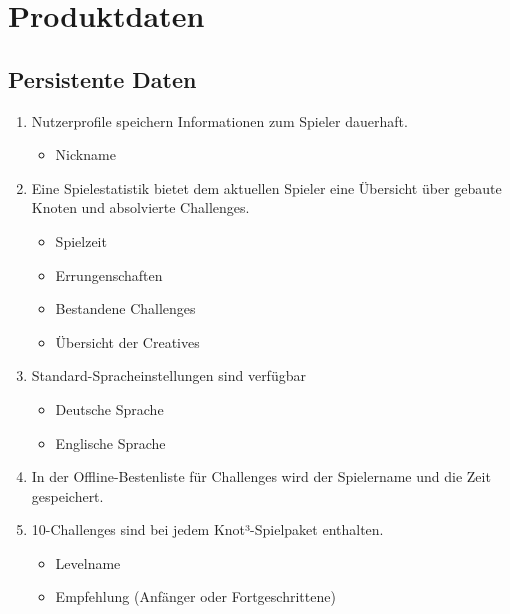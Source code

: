 \chapter{Produktdaten}

\renewcommand{\theenumi}{/PPD\_\arabic{enumi}0/}
\renewcommand{\labelenumi}{\theenumi}

\section{Persistente Daten}

\begin{enumerate}

\item Nutzerprofile speichern Informationen zum Spieler dauerhaft. 

  \begin{itemize}
     \item Nickname
  \end{itemize}

\item Eine Spielestatistik bietet dem aktuellen Spieler eine Übersicht über gebaute Knoten und absolvierte Challenges.

  \begin{itemize}
     \item Spielzeit
     \item Errungenschaften
     \item Bestandene Challenges
     \item Übersicht der Creatives
  \end{itemize}

\item Standard-Spracheinstellungen sind verfügbar

  \begin{itemize}
     \item Deutsche Sprache
     \item Englische Sprache
  \end{itemize}
  

\item In der Offline-Bestenliste für Challenges wird der Spielername und die Zeit gespeichert.
\item 10-Challenges sind bei jedem Knot³-Spielpaket enthalten.

  \begin{itemize}
     \item Levelname
     \item Empfehlung (Anfänger oder Fortgeschrittene)
  \end{itemize}


\end{enumerate}
